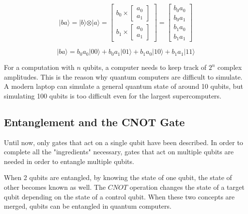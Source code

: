 \begin{linenomath}
\begin{equation}
\vert ba \rangle = \vert b \rangle \otimes \vert a \rangle = \begin{bmatrix}
b_0 \times \begin{bmatrix} a_0 \\ a_1 \end{bmatrix} \\
b_1 \times \begin{bmatrix} a_0 \\ a_1 \end{bmatrix}
\end{bmatrix} = \begin{bmatrix} b_0 a_0 \\ b_0 a_1 \\ b_1 a_0 \\ b_1 a_1 \end{bmatrix} 
\label{eq:kron1}
\end{equation}
\end{linenomath}
\begin{linenomath}
\begin{equation}
\vert ba \rangle = b_0a_0\vert 00 \rangle + b_0a_1\vert 01 \rangle + b_1a_0\vert 10 \rangle + b_1a_1\vert 11 \rangle
\label{eq:kron2}
\end{equation}
\end{linenomath}

For a computation with $n$ qubits, a computer needs to keep track of $2^n$
complex amplitudes. This is the reason why quantum computers are difficult to 
simulate. A modern laptop can simulate a general quantum state of around 10 
qubits, but simulating 100 qubits is too difficult even for the largest 
supercomputers.

\subsection{Entanglement and the CNOT Gate}
\label{sec:cnot}

Until now, only gates that act on a single qubit have been described. In order
to complete all the "ingredients" necessary, gates that act on multiple qubits
are needed in order to entangle multiple qubits.

When 2 qubits are entangled, by knowing the state of one qubit, the state of 
other becomes known as well. The $CNOT$ operation changes the state of a target
qubit depending on the state of a control qubit. When these two concepts are 
merged, qubits can be entangled in quantum computers.

